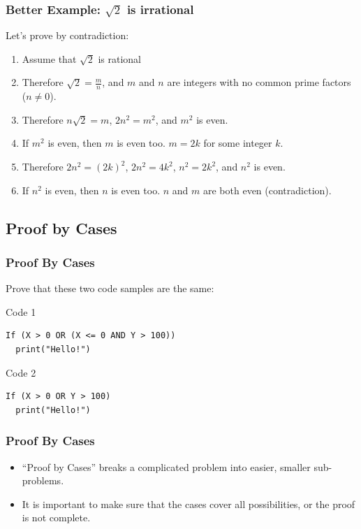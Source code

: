 \begin{frame}
  \frametitle{Better Example: $\sqrt{2}$ is irrational}

  Let's prove by contradiction:

  \bigskip

  \begin{enumerate}
  \item Assume that $\sqrt{2}$ is rational
    \bigskip
  \item Therefore $\sqrt{2} = \frac{m}{n}$, and $m$ and $n$ are
    integers with \alert{no common prime factors} ($n\neq0$).
    \bigskip
  \item Therefore $n\sqrt{2} = m$, $2n^2 = m^2$, and $m^2$ is even.
    \bigskip
  \item If $m^2$ is even, then $m$ is even too. $m = 2k$ for some integer $k$.
    \bigskip
  \item Therefore $2n^2 = (2k)^2$, $2n^2 = 4k^2$, $n^2 = 2k^2$, and $n^2$ is even.
    \bigskip
  \item If $n^2$ is even, then $n$ is even too. \alert{$n$ and $m$ are both even (contradiction).}
  \end{enumerate}



\end{frame}

\subsection{Proof by Cases}

\begin{frame}[fragile]
  \frametitle{Proof By Cases}

  Prove that these two code samples are the same:

  \vfill

  \begin{block}{Code 1}
\begin{verbatim}
If (X > 0 OR (X <= 0 AND Y > 100))
  print("Hello!")
\end{verbatim}
  \end{block}
  \begin{block}{Code 2}
\begin{verbatim}
If (X > 0 OR Y > 100)
  print("Hello!")
\end{verbatim}
  \end{block}

\end{frame}

\begin{frame}
  \frametitle{Proof By Cases}

  \begin{itemize}
  \item ``Proof by Cases'' breaks a complicated problem into easier, smaller sub-problems.

    \bigskip

  \item It is important to make sure that \alert{the cases cover all possibilities}, or the
    proof is not complete.
  \end{itemize}
\end{frame}

